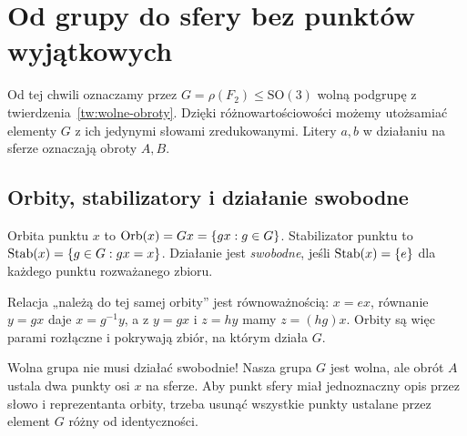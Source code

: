 \section{Od grupy do sfery bez punktów wyjątkowych}
Od tej chwili oznaczamy przez $G=\rho(F_2)\le\mathrm{SO}(3)$ wolną podgrupę z twierdzenia~\ref{tw:wolne-obroty}. Dzięki różnowartościowości możemy utożsamiać elementy $G$ z ich jedynymi słowami zredukowanymi. Litery $a,b$ w działaniu na sferze oznaczają obroty $A,B$.

\subsection{Orbity, stabilizatory i działanie swobodne}
\begin{definicja}
Orbita punktu $x$ to $\operatorname{Orb}(x)=Gx=\{gx:g\in G\}$. Stabilizator punktu to $\operatorname{Stab}(x)=\{g\in G:gx=x\}$. Działanie jest \emph{swobodne}, jeśli $\operatorname{Stab}(x)=\{e\}$ dla każdego punktu rozważanego zbioru.
\end{definicja}
Relacja „należą do tej samej orbity” jest równoważnością: $x=ex$, równanie $y=gx$ daje $x=g^{-1}y$, a z $y=gx$ i $z=hy$ mamy $z=(hg)x$. Orbity są więc parami rozłączne i pokrywają zbiór, na którym działa $G$.
\begin{uwaga}
Wolna grupa nie musi działać swobodnie! Nasza grupa $G$ jest wolna, ale obrót $A$ ustala dwa punkty osi $x$ na sferze. Aby punkt sfery miał jednoznaczny opis przez słowo i reprezentanta orbity, trzeba usunąć wszystkie punkty ustalane przez element $G$ różny od identyczności.
\end{uwaga}

